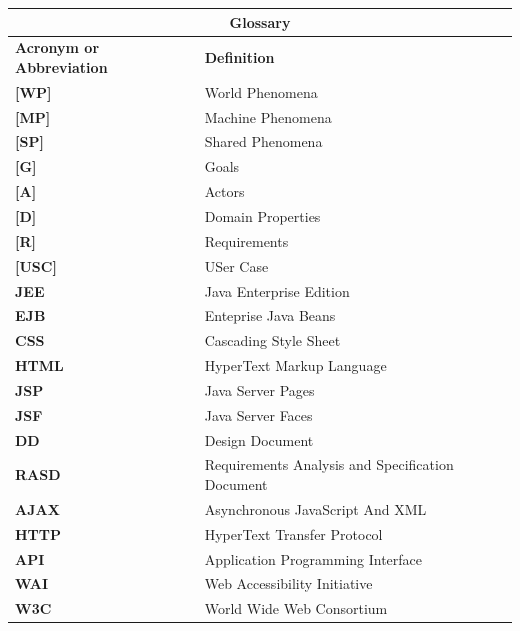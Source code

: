 \documentclass[12pt]{book}
\begin{document}
\begin{tabular}{ |l|l| }
  \hline
  \hline
  \multicolumn{2}{|c|}{\large{\textbf{Glossary}}} \\
  \hline
  \hline
  \textbf{Acronym or Abbreviation} & \textbf{Definition} \\
  \hline
  \textbf{[WP]} & World Phenomena\\
  \textbf{[MP]} & Machine Phenomena\\
  \textbf{[SP]} & Shared Phenomena\\
  \textbf{[G]} & Goals\\
  \textbf{[A]} & Actors\\
  \textbf{[D]} & Domain Properties\\
  \textbf{[R]} & Requirements\\
  \textbf{[USC]} & USer Case\\
  \textbf{JEE} & Java Enterprise Edition\\
  \textbf{EJB} & Enteprise Java Beans\\
  \textbf{CSS} & Cascading Style Sheet\\
  \textbf{HTML} & HyperText Markup Language \\
  \textbf{JSP} & Java Server Pages\\
  \textbf{JSF} & Java Server Faces\\
  \textbf{DD} & Design Document\\
  \textbf{RASD} & Requirements Analysis and Specification Document\\
  \textbf{AJAX} & Asynchronous JavaScript And XML \\
  \textbf{HTTP} & HyperText Transfer Protocol \\
  \textbf{API} & Application Programming Interface \\
  \textbf{WAI} & Web Accessibility Initiative \\
  \textbf{W3C} & World Wide Web Consortium\\
  \hline
  \hline
\end{tabular} \\
\end{document}
